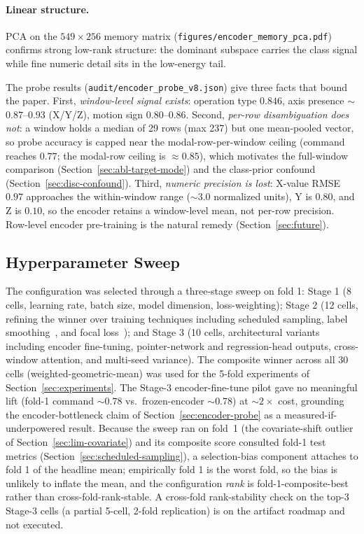 \documentclass[sensors,article,submit,moreauthors,pdftex]{Definitions/mdpi}
\begin{document}
\paragraph{Linear structure.} PCA on the $549 \times 256$ memory matrix (\texttt{figures/encoder\_memory\_pca.pdf}) confirms strong low-rank structure: the dominant subspace carries the class signal while fine numeric detail sits in the low-energy tail.

The probe results (\texttt{audit/encoder\_probe\_v8.json}) give three facts that bound the paper. First, \emph{window-level signal exists}: operation type $0.846$, axis presence $\sim$$0.87$--$0.93$ (X/Y/Z), motion sign $0.80$--$0.86$. Second, \emph{per-row disambiguation does not}: a window holds a median of 29 rows (max 237) but one mean-pooled vector, so probe accuracy is capped near the modal-row-per-window ceiling (command reaches $0.77$; the modal-row ceiling is $\approx\!0.85$), which motivates the full-window comparison (Section~\ref{sec:abl-target-mode}) and the class-prior confound (Section~\ref{sec:disc-confound}). Third, \emph{numeric precision is lost}: X-value RMSE $0.97$ approaches the within-window range ($\sim\!3.0$ normalized units), Y is $0.80$, and Z is $0.10$, so the encoder retains a window-level mean, not per-row precision. Row-level encoder pre-training is the natural remedy (Section~\ref{sec:future}).

\subsection{Hyperparameter Sweep}
\label{sec:hp-sweep}

The configuration was selected through a three-stage sweep on fold 1: Stage 1 (8 cells, learning rate, batch size, model dimension, loss-weighting); Stage 2 (12 cells, refining the winner over training techniques including scheduled sampling, label smoothing~\cite{szegedy2016inception}, and focal loss~\cite{focal_loss}); and Stage 3 (10 cells, architectural variants including encoder fine-tuning, pointer-network and regression-head outputs, cross-window attention, and multi-seed variance). The composite winner across all 30 cells (weighted-geometric-mean) was used for the 5-fold experiments of Section~\ref{sec:experiments}. The Stage-3 encoder-fine-tune pilot gave no meaningful lift (fold-1 command $\sim\!0.78$ vs.\ frozen-encoder $\sim\!0.78$) at $\sim\!2\times$ cost, grounding the encoder-bottleneck claim of Section~\ref{sec:encoder-probe} as a measured-if-underpowered result. Because the sweep ran on fold~1 (the covariate-shift outlier of Section~\ref{sec:lim-covariate}) and its composite score consulted fold-1 test metrics (Section~\ref{sec:scheduled-sampling}), a selection-bias component attaches to fold 1 of the headline mean; empirically fold 1 is the worst fold, so the bias is unlikely to inflate the mean, and the configuration \emph{rank} is fold-1-composite-best rather than cross-fold-rank-stable. A cross-fold rank-stability check on the top-3 Stage-3 cells (a partial 5-cell, 2-fold replication) is on the artifact roadmap and not executed.
\end{document}
